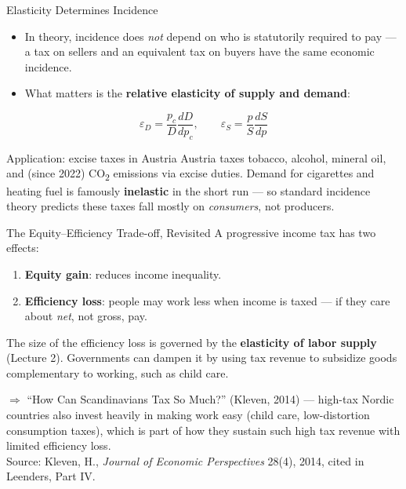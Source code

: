 \documentclass[11pt,aspectratio=169]{beamer}
\newcommand{\srcnote}[1]{{\footnotesize\color{wugray}Source: #1}}
\begin{document}
\begin{frame}{Elasticity Determines Incidence}
  \begin{itemize}
    \item In theory, incidence does \emph{not} depend on who is statutorily required to pay --- a tax on sellers and an equivalent tax on buyers have the same economic incidence.
    \item What matters is the \textbf{relative elasticity of supply and demand}:
  \end{itemize}
  \[
    \varepsilon_D = \frac{p_c}{D}\frac{dD}{dp_c}, \qquad \varepsilon_S = \frac{p}{S}\frac{dS}{dp}
  \]
  \vspace{0.3em}
  \begin{alertblock}{Application: excise taxes in Austria}
    Austria taxes tobacco, alcohol, mineral oil, and (since 2022) CO\textsubscript{2} emissions via excise duties. Demand for cigarettes and heating fuel is famously \textbf{inelastic} in the short run --- so standard incidence theory predicts these taxes fall mostly on \emph{consumers}, not producers.
  \end{alertblock}
\end{frame}

\begin{frame}{The Equity--Efficiency Trade-off, Revisited}
  \small
  A progressive income tax has two effects:
  \begin{enumerate}
    \item \textbf{Equity gain}: reduces income inequality.
    \item \textbf{Efficiency loss}: people may work less when income is taxed --- if they care about \emph{net}, not gross, pay.
  \end{enumerate}
  \vspace{0.3em}
  The size of the efficiency loss is governed by the \textbf{elasticity of labor supply} (Lecture 2). Governments can dampen it by using tax revenue to subsidize goods complementary to working, such as child care.
  \vspace{0.3em}

  \(\Rightarrow\) ``How Can Scandinavians Tax So Much?'' (Kleven, 2014) --- high-tax Nordic countries also invest heavily in making work easy (child care, low-distortion consumption taxes), which is part of how they sustain such high tax revenue with limited efficiency loss.\\
  \srcnote{Kleven, H., \emph{Journal of Economic Perspectives} 28(4), 2014, cited in Leenders, Part IV.}
\end{frame}
\end{document}
